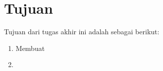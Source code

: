 \section{Tujuan}
\label{sec:Tujuan}

Tujuan dari tugas akhir ini adalah sebagai berikut:

\begin{enumerate}[nolistsep]

  \item Membuat \textcolor{red}{\lipsum[1][1-3]}

  \item \textcolor{red}{\lipsum[2][1-2]}

\end{enumerate}
